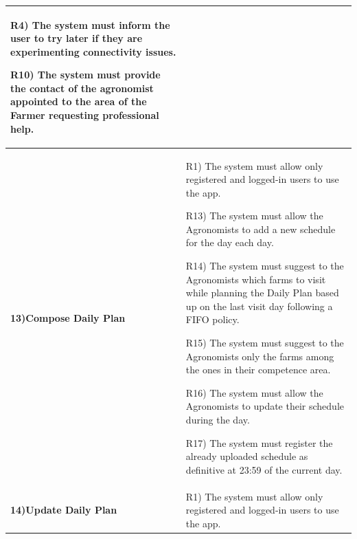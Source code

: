 \documentclass[table, 12pt]{article}
\begin{document}
\begin{itemize}
\begin{longtable}{|p{}|p{}|}
                                                                                            R4) The system must inform the user to try later if they are experimenting connectivity issues.

                                                                                            R10) The system must provide the contact of the agronomist appointed to the area of the Farmer requesting professional help.\\\hline
                                                                                  
                    \cellcolor{SpringGreen!50}\textbf{13)Compose Daily Plan}\centering &  R1) The system must allow only registered and logged-in users to use the app.
                    
                                                                                          R13) The system must allow the Agronomists to add a new schedule for the day each day.

                                                                                          R14) The system must suggest to the Agronomists which
                                                                                          farms to visit while planning the Daily Plan based
                                                                                          up on the last visit day following a FIFO policy.

                                                                                          R15) The system must suggest to the Agronomists only the farms among the ones in their competence area.
                                                                                        
                                                                                          R16) The system must allow the Agronomists to update their schedule during the day.
                                                                                          
                                                                                          R17) The system must register the already uploaded schedule as definitive at 23:59 of the current day.\\\hline
                    \cellcolor{SpringGreen!50}\textbf{14)Update Daily Plan}\centering &  R1) The system must allow only registered and logged-in users to use the app.
                    

\end{longtable}
\end{itemize}
\end{document}
